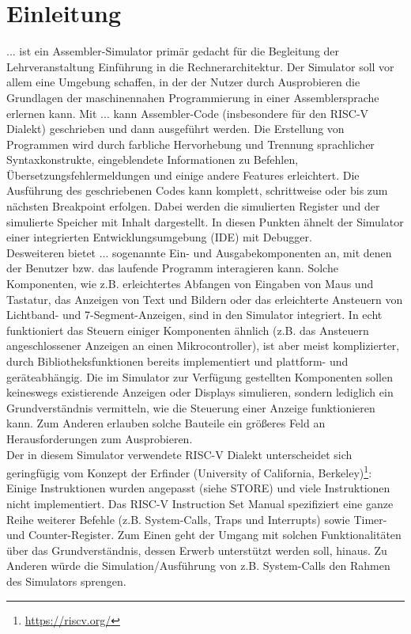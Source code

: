 
\section{Einleitung}


... ist ein Assembler-Simulator primär gedacht für die Begleitung der Lehrveranstaltung Einführung in die Rechnerarchitektur.
Der Simulator soll vor allem eine Umgebung schaffen, in der der Nutzer durch Ausprobieren die Grundlagen der maschinennahen Programmierung in einer Assemblersprache erlernen kann.
Mit ... kann Assembler-Code (insbesondere für den RISC-V Dialekt) geschrieben und dann ausgeführt werden. Die Erstellung von Programmen wird durch farbliche Hervorhebung und Trennung sprachlicher Syntaxkonstrukte, eingeblendete Informationen zu Befehlen, Übersetzungsfehlermeldungen und einige andere Features erleichtert. Die Ausführung des geschriebenen Codes kann komplett, schrittweise oder bis zum nächsten Breakpoint erfolgen. Dabei werden die simulierten Register und der simulierte Speicher mit Inhalt dargestellt. In diesen Punkten ähnelt der Simulator einer integrierten Entwicklungsumgebung (IDE) mit Debugger.\\
Desweiteren bietet ... sogenannte Ein- und Ausgabekomponenten an, mit denen der Benutzer bzw. das laufende Programm interagieren kann. Solche Komponenten, wie z.B. erleichtertes Abfangen von Eingaben von Maus und Tastatur, das Anzeigen von Text und Bildern oder das erleichterte Ansteuern von Lichtband- und 7-Segment-Anzeigen, sind in den Simulator integriert. In echt funktioniert das Steuern einiger Komponenten ähnlich (z.B. das Ansteuern angeschlossener Anzeigen an einen Mikrocontroller), ist aber meist komplizierter, durch Bibliotheksfunktionen bereits implementiert und plattform- und geräteabhängig. Die im Simulator zur Verfügung gestellten Komponenten sollen keineswegs existierende Anzeigen oder Displays simulieren, sondern lediglich ein Grundverständnis vermitteln, wie die Steuerung einer Anzeige funktionieren kann. Zum Anderen erlauben solche Bauteile ein größeres Feld an Herausforderungen zum Ausprobieren.\\
Der in diesem Simulator verwendete RISC-V Dialekt unterscheidet sich geringfügig vom Konzept der Erfinder (University of California, Berkeley)\footnote{\url{https://riscv.org/}}: Einige Instruktionen wurden angepasst (siehe STORE) und viele Instruktionen nicht implementiert. Das RISC-V Instruction Set Manual spezifiziert eine ganze Reihe weiterer Befehle (z.B. System-Calls, Traps und Interrupts) sowie Timer- und Counter-Register. Zum Einen geht der Umgang mit solchen Funktionalitäten über das Grundverständnis, dessen Erwerb unterstützt werden soll, hinaus. Zu Anderen würde die Simulation/Ausführung von z.B. System-Calls den Rahmen des Simulators sprengen.\\

